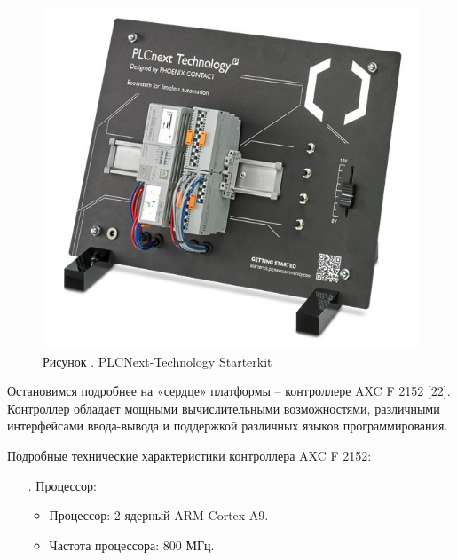 {	
	\begin{figure}[H]
		\centering
		\def\svgwidth{\textwidth}
		\includegraphics[scale=0.8]{images/pclnext_x.jpg}
		\caption*{\gostFont Рисунок \thechaptercntr .\theimagecntr \spc {--} PLCNext-Technology Starterkit}
	\end{figure}  \addtocounter{imagecntr}{1}
	
	
	\par \redline Остановимся подробнее на «сердце» платформы – контроллере AXC F 2152 [22]. Контроллер обладает мощными вычислительными возможностями, различными интерфейсами ввода-вывода и поддержкой различных языков программирования.
	
	\par \redline Подробные технические характеристики контроллера AXC F 2152:
	
	\begin{itemize}[leftmargin=2.15cm, labelwidth=0.65cm, labelsep=0.0cm] 
		
		\item[\theitemcntr. ] Процессор:
		
		\begin{itemize}[leftmargin=1.15cm, labelwidth=0.65cm, labelsep=0.0cm] 
			
			\item Процессор: 2-ядерный ARM Cortex-A9.
			
			\item Частота процессора: 800 МГц.
			

\end{itemize}
\end{itemize}}
